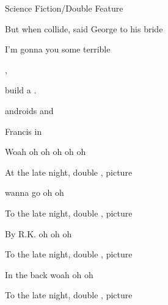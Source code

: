 \begin{SBSong}{Science Fiction/Double Feature}
\begin{SBVerse}
    But when  collide, said George  to his bride

    I'm gonna  you some terrible 
  \end{SBVerse}
  \begin{SBChorus}
     ,  

       build a .

     androids   and 

     Francis  in  

    Woah oh oh oh  oh oh

    At the late night, double , picture 
  \end{SBChorus}
  \begin{SBVerse}
     wanna go   oh oh

    To the late night, double , picture 

    By R.K.  oh oh oh

    To the late night, double , picture 

    In the back  woah  oh oh

    To the late night, double , picture 
  \end{SBVerse}
\end{SBSong}
